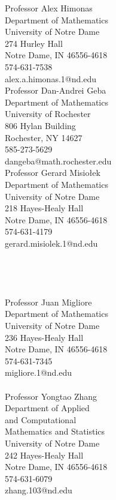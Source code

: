 \documentclass[11pt,oneside]{amsart}
\renewcommand{\section}[2]%
{\vspace{0.7cm}%
\hspace{0in}%
\marginpar{\scshape #1}#2}
\begin{document}
\section{References}
\vspace{-0.85cm}
\begin{multicols}{1}
Professor Alex Himonas \\
Department of Mathematics \\
University of Notre Dame  \\	
274 Hurley Hall \\
Notre Dame, IN 46556-4618	\\
574-631-7538  \\
alex.a.himonas.1@nd.edu \\

Professor Dan-Andrei Geba \\
Department of Mathematics \\ 
University of Rochester \\
806 Hylan Building \\ 
Rochester, NY 14627 \\ 
585-273-5629 \\
dangeba@math.rochester.edu \\

Professor Gerard Misio{\l}ek \\
Department of Mathematics \\
University of Notre Dame \\
218 Hayes-Healy Hall \\
Notre Dame, IN 46556-4618 \\
574-631-4179 \\
gerard.misiolek.1@nd.edu \\
\\
\\
\\
\\
Professor Juan Migliore \\
Department of Mathematics \\
University of Notre Dame \\
236 Hayes-Healy Hall \\
Notre Dame, IN 46556-4618 \\
574-631-7345\\
migliore.1@nd.edu\\
\\
Professor Yongtao Zhang \\
Department of Applied \\ 
and Computational \\ 
Mathematics and Statistics  \\
University of Notre Dame \\
242 Hayes-Healy Hall \\
Notre Dame, IN 46556-4618 \\
574-631-6079 \\
zhang.103@nd.edu \\
\end{multicols}
\end{document}
